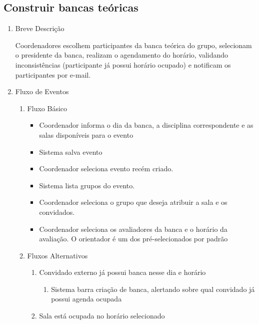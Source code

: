 \subsection{Construir bancas teóricas}


\begin{enumerate}
    \item Breve Descrição


Coordenadores escolhem participantes da banca teórica do grupo, selecionam o presidente da banca, realizam o agendamento do horário, validando inconsistências (participante já possui horário ocupado) e notificam os participantes por e-mail.


    \item Fluxo de Eventos

\begin{enumerate}
    \item Fluxo Básico

\begin{itemize}
    \item Coordenador informa o dia da banca, a disciplina correspondente e as salas disponíveis para o evento

    \item Sistema salva evento

    \item Coordenador seleciona evento recém criado.

    \item Sistema lista grupos do evento.

    \item Coordenador seleciona o grupo que deseja atribuir a sala e os convidados.

    \item Coordenador seleciona os avaliadores da banca e o horário da avaliação. O orientador é um dos pré-selecionados por padrão
\end{itemize}

    \item Fluxos Alternativos

\begin{enumerate}
    \item Convidado externo já possui banca nesse dia e horário

\begin{enumerate}
    \item Sistema barra criação de banca, alertando sobre qual convidado já possui agenda ocupada


\end{enumerate}
    \item Sala está ocupada no horário selecionado


\end{enumerate}
\end{enumerate}
\end{enumerate}
